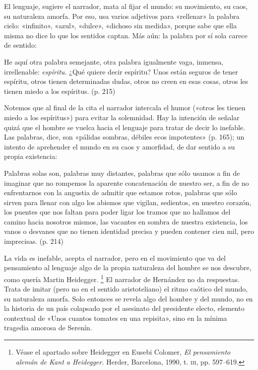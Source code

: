 \documentclass[14pt,twoside,final]{extbook} %
\let\oldfootnote\footnote
\renewcommand\footnote[1]{%
\oldfootnote{\hspace{1mm}#1}}
\begin{document}
El lenguaje, sugiere el narrador, mata al fijar el mundo: su movimiento, su caos, su naturaleza amorfa. Por eso, usa varios adjetivos para «rellenar» la palabra cielo: «infinito», «azul», «dulce», «dichoso sin medida», porque sabe que ella misma no dice lo que los sentidos captan. Más aún: la palabra por sí sola carece de sentido:
\begin{quoting}
He aquí otra palabra semejante, otra palabra igualmente vaga, inmensa, irrellenable: \emph{espíritu.} ¿Qué quiere decir espíritu? Unos están seguros de tener espíritu, otros tienen determinadas dudas, otros no creen en esas cosas, otros les tienen miedo a los espíritus. (p. 215)
\end{quoting}
Notemos que al final de la cita el narrador intercala el humor («otros les tienen miedo a los espíritus») para evitar la solemnidad. Hay la intención de señalar quizá que el hombre se vuelca hacia el lenguaje para tratar de decir lo inefable. Las palabras, dice, son «pálidas sombras, débiles ecos impotentes» (p. 165); un intento de aprehender el mundo en su caos y amorfidad, de dar sentido a su propia existencia:
\begin{quoting}
Palabras solas son, palabras muy distantes, palabras que sólo usamos a fin de imaginar que no rompemos la aparente concatenación de nuestro ser, a fin de no enfrentarnos con la angustia de admitir que estamos rotos, palabras que sólo sirven para llenar con algo los abismos que vigilan, sedientos, en nuestro corazón, los puentes que nos faltan para poder ligar los tramos que no hallamos del camino hacia nosotros mismos, las vacantes en sombra de nuestra existencia, los vanos o desvanes que no tienen identidad precisa y pueden contener cien mil, pero imprecisas. (p. 214)
\end{quoting}
La vida es inefable, acepta el narrador, pero en el movimiento que va del pensamiento al lenguaje algo de la propia naturaleza del hombre se nos descubre, como quería Martin Heidegger.\footnote{Véase el apartado sobre Heidegger en Eusebi Colomer, \emph{El pensamiento alemán de Kant a Heidegger.} Herder, Barcelona, 1990, t. \textsc{iii}, pp. 597--619.} El narrador de Hernández no da respuestas. Trata de imitar (pero no en el sentido aristoteliano) el ritmo caótico del mundo, su naturaleza amorfa. Solo entonces se revela algo del hombre y del mundo, no en la historia de un país colapsado por el asesinato del presidente electo, elemento contextual de «Unos cuantos tomates en una repisita», sino en la mínima tragedia amorosa de Serenín.
\end{document}
